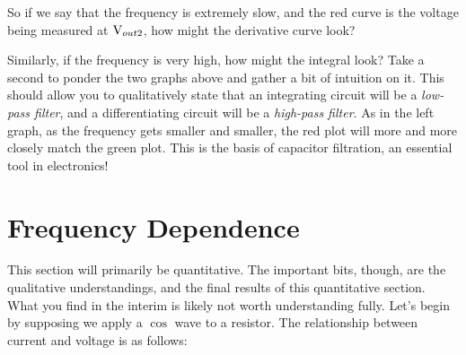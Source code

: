 \documentclass[12pt]{report}
\newcommand{\V}{{\rm V}}
\begin{document}
So if we say that the frequency is extremely slow, and the red curve is the voltage being measured at $\V_{out2}$, how might the derivative curve look? 

\begin{multicols}{2}

\end{multicols}

Similarly, if the frequency is very high, how might the integral look? Take a second to ponder the two graphs above and gather a bit of intuition on it. This should allow you to qualitatively state that an integrating circuit will be a \textit{low-pass filter}, and a differentiating circuit will be a \textit{high-pass filter}. As in the left graph, as the frequency gets smaller and smaller, the red plot will more and more closely match the green plot. This is the basis of capacitor filtration, an essential tool in electronics!

\section{Frequency Dependence}
This section will primarily be quantitative. The important bits, though, are the qualitative understandings, and the final results of this quantitative section. What you find in the interim is likely not worth understanding fully. Let's begin by supposing we apply a $\cos$ wave to a resistor. The relationship between current and voltage is as follows:
\end{document}
